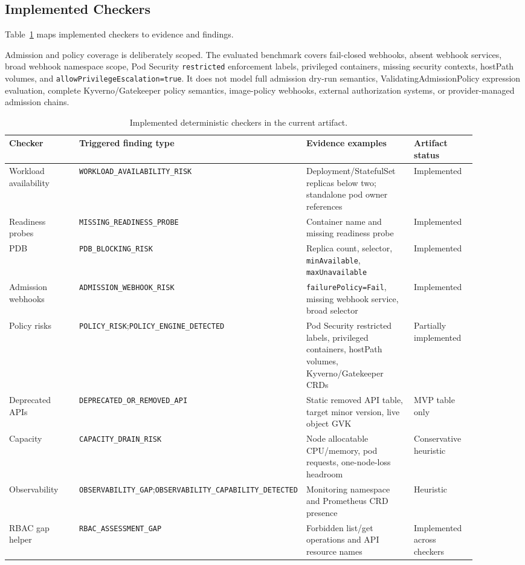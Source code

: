 \documentclass[10pt,journal]{IEEEtran}
\newcommand{\code}[1]{\texttt{#1}}
\begin{document}
\subsection{Implemented Checkers}
Table~\ref{tab:checkers} maps implemented checkers to evidence and findings.

Admission and policy coverage is deliberately scoped. The evaluated benchmark covers fail-closed webhooks, absent webhook services, broad webhook namespace scope, Pod Security \code{restricted} enforcement labels, privileged containers, missing security contexts, hostPath volumes, and \code{allowPrivilegeEscalation=true}. It does not model full admission dry-run semantics, ValidatingAdmissionPolicy expression evaluation, complete Kyverno/Gatekeeper policy semantics, image-policy webhooks, external authorization systems, or provider-managed admission chains.

\begin{table}[t]
  \centering
  \caption{Implemented deterministic checkers in the current artifact.}
  \label{tab:checkers}
  \scriptsize
  \begin{tabular}{p{0.20\linewidth}p{0.27\linewidth}p{0.27\linewidth}p{0.16\linewidth}}
    \toprule
    Checker & Triggered finding type & Evidence examples & Artifact status \\
    \midrule
    Workload availability & \code{WORKLOAD\_AVAILABILITY\_RISK} & Deployment/StatefulSet replicas below two; standalone pod owner references & Implemented \\
    Readiness probes & \code{MISSING\_READINESS\_PROBE} & Container name and missing readiness probe & Implemented \\
    PDB & \code{PDB\_BLOCKING\_RISK} & Replica count, selector, \code{minAvailable}, \code{maxUnavailable} & Implemented \\
    Admission webhooks & \code{ADMISSION\_WEBHOOK\_RISK} & \code{failurePolicy=Fail}, missing webhook service, broad selector & Implemented \\
    Policy risks & \code{POLICY\_RISK};\newline \code{POLICY\_ENGINE\_DETECTED} & Pod Security restricted labels, privileged containers, hostPath volumes, Kyverno/Gatekeeper CRDs & Partially implemented \\
    Deprecated APIs & \code{DEPRECATED\_OR\_REMOVED\_API} & Static removed API table, target minor version, live object GVK & MVP table only \\
    Capacity & \code{CAPACITY\_DRAIN\_RISK} & Node allocatable CPU/memory, pod requests, one-node-loss headroom & Conservative heuristic \\
    Observability & \code{OBSERVABILITY\_GAP};\newline \code{OBSERVABILITY\_CAPABILITY\_DETECTED} & Monitoring namespace and Prometheus CRD presence & Heuristic \\
    RBAC gap helper & \code{RBAC\_ASSESSMENT\_GAP} & Forbidden list/get operations and API resource names & Implemented across checkers \\
    \bottomrule
  \end{tabular}
\end{table}
\end{document}

